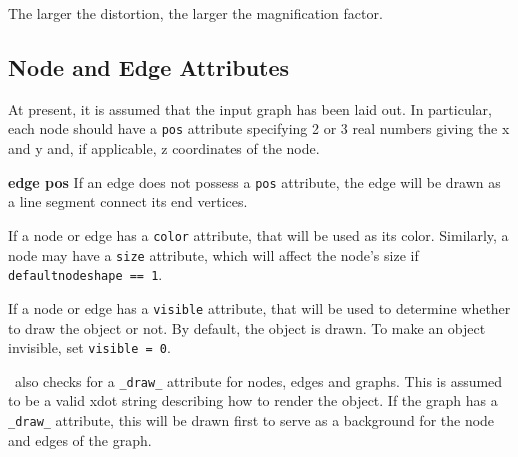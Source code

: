The larger the distortion, the larger the magnification factor.

\subsection{Node and Edge Attributes}
At present, it is assumed that the input graph has been laid out. In particular,
each node should have a {\tt pos} attribute specifying 2 or 3 real numbers giving the
x and y and, if applicable, z coordinates of the node. 

{\bf edge pos}
If an edge does not possess a {\tt pos} attribute, the edge will be drawn as a line segment
connect its end vertices.

If a node or edge has a {\tt color} attribute, that will be used as its color.
Similarly, a node may have a {\tt size} attribute, which will affect the node's size if
{\tt defaultnodeshape == 1}.

If a node or edge has a {\tt visible} attribute, that will be used to determine whether
to draw the object or not. By default, the object is drawn.
To make an object invisible, set {\tt visible = 0}.

\smyrna\ also checks for a {\tt \_draw\_} attribute
for nodes, edges and graphs. This is assumed to be a valid xdot string describing how to 
render the object. If the graph has a {\tt \_draw\_} attribute, this will be drawn first to serve
as a background for the node and edges of the graph.


